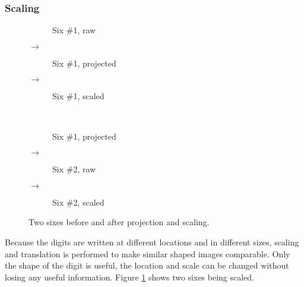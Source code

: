 \documentclass[report.tex]{subfile}
\begin{document}
\subsubsection{Scaling}
\begin{figure}
    \centering
    \begin{subfigure}[c]{0.3\textwidth}
        \resizebox{\textwidth}{!}{}
        \caption{Six \#1, raw}
    \end{subfigure}%
    {\large $\rightarrow$}
    \begin{subfigure}[c]{0.3\textwidth}
        \resizebox{\textwidth}{!}{}
        \caption{Six \#1, projected}
    \end{subfigure}%
    {\large $\rightarrow$}
    \begin{subfigure}[c]{0.3\textwidth}
        \resizebox{\textwidth}{!}{}
        \caption{Six \#1, scaled}
    \end{subfigure}\\
    \begin{subfigure}[c]{0.3\textwidth}
        \resizebox{\textwidth}{!}{}
        \caption{Six \#1, projected}
    \end{subfigure}%
    {\large $\rightarrow$}
    \begin{subfigure}[c]{0.3\textwidth}
        \resizebox{\textwidth}{!}{}
        \caption{Six \#2, raw}
    \end{subfigure}%
    {\large $\rightarrow$}
    \begin{subfigure}[c]{0.3\textwidth}
        \resizebox{\textwidth}{!}{}
        \caption{Six \#2, scaled}
    \end{subfigure}
    \caption{Two sixes before and after projection and scaling.}
    \label{fig:scaling}
\end{figure}
Because the digits are written at different locations and in different sizes,
scaling and translation is performed to make similar shaped images comparable.
Only the shape of the digit is useful, the location and scale can be changed
without losing any useful information. Figure \ref{fig:scaling} shows two sixes
being scaled.
\end{document}
